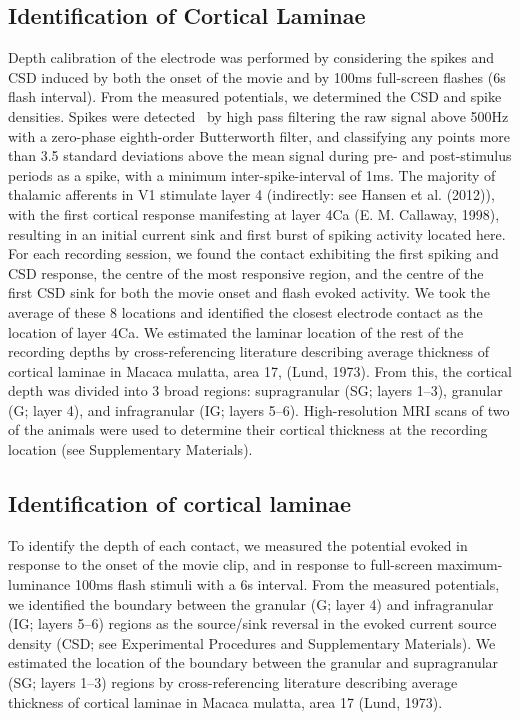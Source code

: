 \documentclass{article}
\begin{document}
\subsection{Identification of Cortical Laminae}
Depth calibration of the electrode was performed by considering the spikes and CSD induced by both the onset of the movie and by 100ms full-screen flashes (6s flash interval). From the measured potentials, we determined the CSD and spike densities. Spikes were detected \ by high pass filtering the raw signal above 500Hz with a zero-phase eighth-order Butterworth filter, and classifying any points more than 3.5 standard deviations above the mean signal during pre- and post-stimulus periods as a spike, with a minimum inter-spike-interval of 1ms. The majority of thalamic afferents in V1 stimulate layer 4 (indirectly: see Hansen et al. (2012)), with the first cortical response manifesting at layer 4C\textgreek{a (}E. M. Callaway, 1998), resulting in an initial current sink and first burst of spiking activity located here. For each recording session, we found the contact exhibiting the first spiking and CSD response, the centre of the most responsive region, and the centre of the first CSD sink for both the movie onset and flash evoked activity. We took the average of these 8 locations and identified the closest electrode contact as the location of layer 4C\textgreek{a. }We estimated the laminar location of the rest of the recording depths by cross-referencing literature describing average thickness of cortical laminae in Macaca mulatta, area 17, (Lund, 1973). From this, the cortical depth was divided into 3 broad regions: supragranular (SG; layers 1--3), granular (G; layer 4), and infragranular (IG; layers 5--6). High-resolution MRI scans of two of the animals were used to determine their cortical thickness at the recording location (see Supplementary Materials).

\subsection{Identification of cortical laminae}
To identify the depth of each contact, we measured the potential evoked in response to the onset of the movie clip, and in response to full-screen maximum-luminance 100ms flash stimuli with a 6s interval. From the measured potentials, we identified the boundary between the granular (G; layer 4) and infragranular (IG; layers 5--6) regions as the source/sink reversal in the evoked current source density (CSD; see Experimental Procedures and Supplementary Materials). We estimated the location of the boundary between the granular and supragranular (SG; layers 1--3) regions by cross-referencing literature describing average thickness of cortical laminae in Macaca mulatta, area 17 (Lund, 1973).
\end{document}
